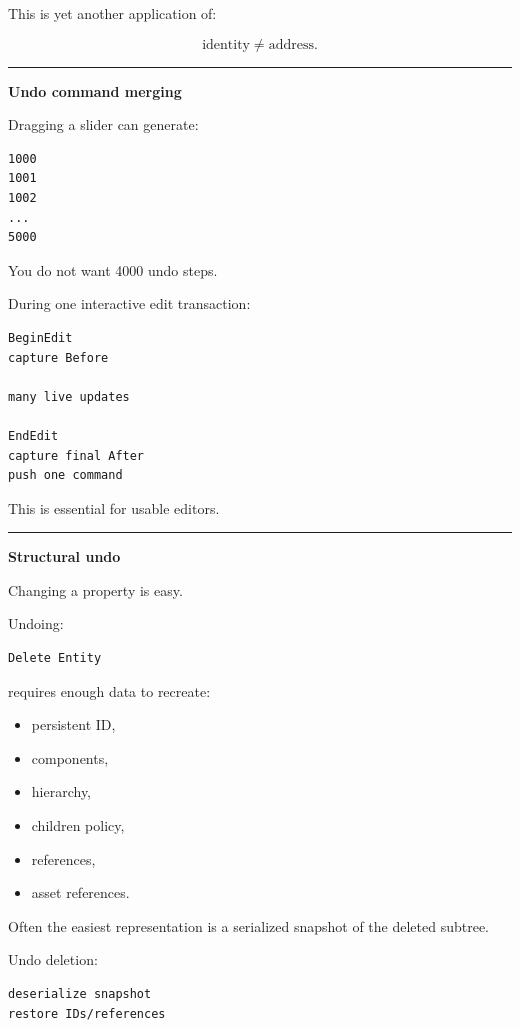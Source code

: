 This is yet another application of:

\[
\text{identity}\neq\text{address}.
\]

\begin{center}\rule{0.5\linewidth}{0.5pt}\end{center}

\textbf{Undo command merging}

Dragging a slider can generate:

\begin{verbatim}
1000
1001
1002
...
5000
\end{verbatim}

You do not want 4000 undo steps.

During one interactive edit transaction:

\begin{verbatim}
BeginEdit
capture Before

many live updates

EndEdit
capture final After
push one command
\end{verbatim}

This is essential for usable editors.

\begin{center}\rule{0.5\linewidth}{0.5pt}\end{center}

\textbf{Structural undo}

Changing a property is easy.

Undoing:

\begin{verbatim}
Delete Entity
\end{verbatim}

requires enough data to recreate:

\begin{itemize}
\tightlist
\item
  persistent ID,
\item
  components,
\item
  hierarchy,
\item
  children policy,
\item
  references,
\item
  asset references.
\end{itemize}

Often the easiest representation is a serialized snapshot of the deleted subtree.

Undo deletion:

\begin{verbatim}
deserialize snapshot
restore IDs/references
\end{verbatim}

